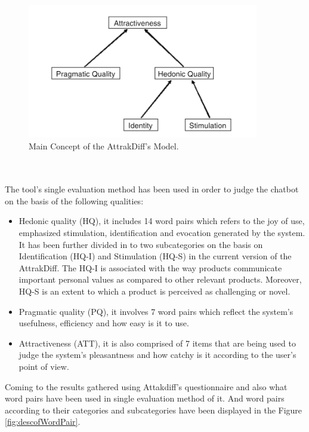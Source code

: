 \begin{figure}[!h]
    \centering
    \includegraphics[width=0.9\textwidth]{img/AttrakDiff_Model.PNG}
    \caption{Main Concept of the AttrakDiff's Model. \cite{inflOfHedandPrag}}
    \label{fig:attrakMod}
\end{figure}
\\~\\
The tool's single evaluation method has been used in order to judge the chatbot on the basis of the following qualities:
\begin{itemize}
    \item Hedonic quality (HQ), it includes 14 word pairs which refers to the joy of use, emphasized stimulation, identification and evocation generated by the system. It has been further divided in to two subcategories on the basis on Identification (HQ-I) and Stimulation (HQ-S) in the current version of the AttrakDiff. The HQ-I is associated with the way products communicate important personal values as compared to other relevant products. Moreover, HQ-S is an extent to which a product is perceived as challenging or novel.
    \item Pragmatic quality (PQ), it involves 7 word pairs which reflect the system's usefulness, efficiency and how easy is it to use.
    \item Attractiveness (ATT), it is also comprised of 7 items that are being used to judge the system's pleasantness and how catchy is it according to the user's point of view.
\end{itemize} 
Coming to the results gathered using Attakdiff's questionnaire and also what word pairs have been used in single evaluation method of it. And word pairs according to their categories and subcategories have been displayed in the Figure \ref{fig:descofWordPair}.

